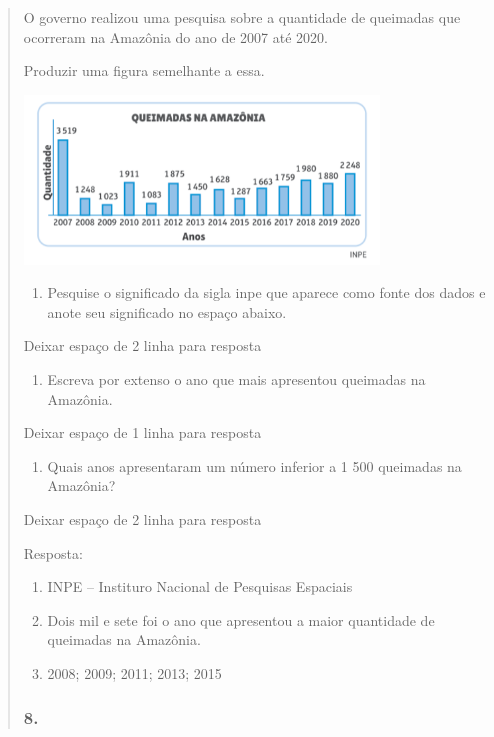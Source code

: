 \begin{enumerate}
\begin{escolha}
\begin{enumerate}
\begin{itemize}
\begin{itemize}
\begin{escolha}
\begin{quote}
\begin{escolha}
{O governo realizou uma pesquisa sobre a quantidade de queimadas que
ocorreram na Amazônia do ano de 2007 até 2020.

Produzir uma figura semelhante a essa.

\includegraphics[width=3.71154in,height=1.76937in]{media/image99.png}

\begin{enumerate}
\def\labelenumi{\alph{enumi})}
\item
  Pesquise o significado da sigla inpe que aparece como fonte dos dados
  e anote seu significado no espaço abaixo.
\end{enumerate}

Deixar espaço de 2 linha para resposta

\begin{enumerate}
\def\labelenumi{\alph{enumi})}
\item
  Escreva por extenso o ano que mais apresentou queimadas na Amazônia.
\end{enumerate}

Deixar espaço de 1 linha para resposta

\begin{enumerate}
\def\labelenumi{\alph{enumi})}
\item
  Quais anos apresentaram um número inferior a 1 500 queimadas na
  Amazônia?
\end{enumerate}

Deixar espaço de 2 linha para resposta

Resposta:

\begin{enumerate}
\def\labelenumi{\alph{enumi})}
\item
  INPE -- Instituro Nacional de Pesquisas Espaciais
\item
  Dois mil e sete foi o ano que apresentou a maior quantidade de
  queimadas na Amazônia.
\item
  2008; 2009; 2011; 2013; 2015
\end{enumerate}

\subsubsection{8.}\label{section-98}

}
\end{escolha}
\end{quote}
\end{escolha}
\end{itemize}
\end{itemize}
\end{enumerate}
\end{escolha}
\end{enumerate}
